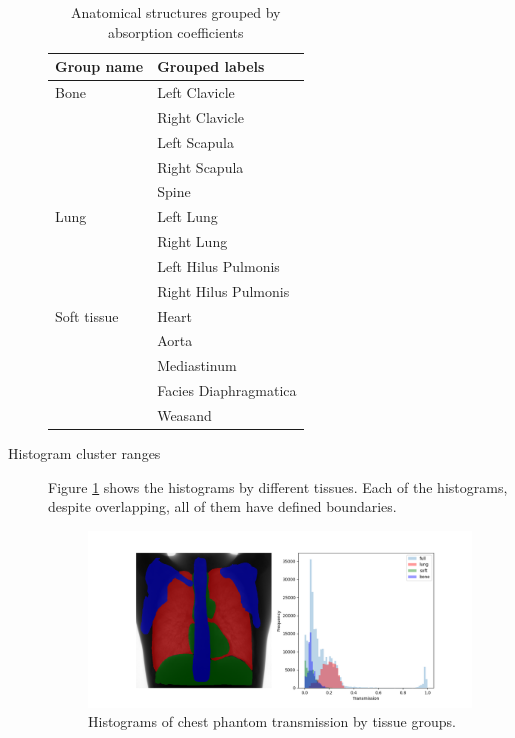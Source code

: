 \documentclass[nomenclature, english, bibtex]{kththesis}
\numberwithin{listing}{chapter}
\begin{document}
\begin{description}
    \begin{table}[H]
        \centering
        \begin{tabular}{|l| l|}
            \hline
            \textbf{Group name} & \textbf{Grouped labels} \\
            \hline
            Bone &  Left Clavicle\\
                & Right Clavicle \\
                & Left Scapula\\
                &Right Scapula\\
                &Spine \\
            \hline
            Lung &  Left Lung \\
                & Right Lung \\
                & Left Hilus Pulmonis \\
                & Right Hilus Pulmonis \\
            \hline
            Soft tissue &  Heart \\
            & Aorta \\
            & Mediastinum \\
            & Facies Diaphragmatica \\
            & Weasand \\
            \hline
        \end{tabular}
        \caption{Anatomical structures grouped by absorption coefficients}
        \label{tab:segmentationGroups}
    \end{table}

    \item[Histogram cluster ranges] Figure \ref{fig:segmentationTransmissionMapsHistograms} shows the histograms
    by different tissues. Each of the histograms, despite overlapping, all of them
    have defined boundaries.

    \begin{figure}[H]
        \centering
        \includegraphics[width=1.0\textwidth]{figures/segmentation_txm_histograms.png}
        \caption{Histograms of chest phantom transmission by tissue groups.}
        \label{fig:segmentationTransmissionMapsHistograms}
    \end{figure}


\end{description}
\end{document}
